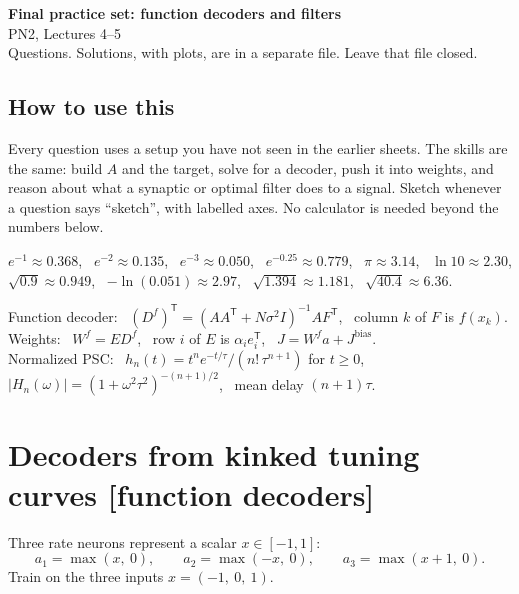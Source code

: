 \documentclass[11pt,letterpaper]{article}
\newcommand{\Jb}{J^{\mathrm{bias}}}
\newcommand{\T}{\mathsf T}
\begin{document}
\begin{center}
{\Large\bfseries Final practice set: function decoders and filters}\\[2pt]
{\large PN2, Lectures 4--5}\\[4pt]
{\normalsize Questions. Solutions, with plots, are in a separate file. Leave that file closed.}
\end{center}

\subsection*{How to use this}

Every question uses a setup you have not seen in the earlier sheets. The skills are the same: build $A$ and the target, solve for a decoder, push it into weights, and reason about what a synaptic or optimal filter does to a signal. Sketch whenever a question says ``sketch'', with labelled axes. No calculator is needed beyond the numbers below.

\begin{idea}
$e^{-1} \approx 0.368$, \ $e^{-2} \approx 0.135$, \ $e^{-3} \approx 0.050$, \ $e^{-0.25} \approx 0.779$, \ $\pi \approx 3.14$, \ $\ln 10 \approx 2.30$, \\
$\sqrt{0.9} \approx 0.949$, \ $-\ln(0.051) \approx 2.97$, \ $\sqrt{1.394} \approx 1.181$, \ $\sqrt{40.4} \approx 6.36$.
\end{idea}

\begin{idea}
Function decoder: \ $(D^f)^\T = (AA^\T + N\sigma^2 I)^{-1} A F^\T$, \ column $k$ of $F$ is $f(x_k)$. \\
Weights: \ $W^f = E D^f$, \ row $i$ of $E$ is $\alpha_i e_i^\T$, \ $J = W^f a + \Jb$. \\
Normalized PSC: \ $h_n(t) = t^n e^{-t/\tau} / (n!\,\tau^{n+1})$ for $t \ge 0$, \ $|H_n(\omega)| = (1 + \omega^2\tau^2)^{-(n+1)/2}$, \ mean delay $(n+1)\tau$.
\end{idea}

\section{Decoders from kinked tuning curves \hfill [function decoders]}

Three rate neurons represent a scalar $x \in [-1, 1]$:
\[
a_1 = \max(x,\ 0), \qquad a_2 = \max(-x,\ 0), \qquad a_3 = \max(x + 1,\ 0).
\]
Train on the three inputs $x = (-1,\ 0,\ 1)$.
\end{document}
